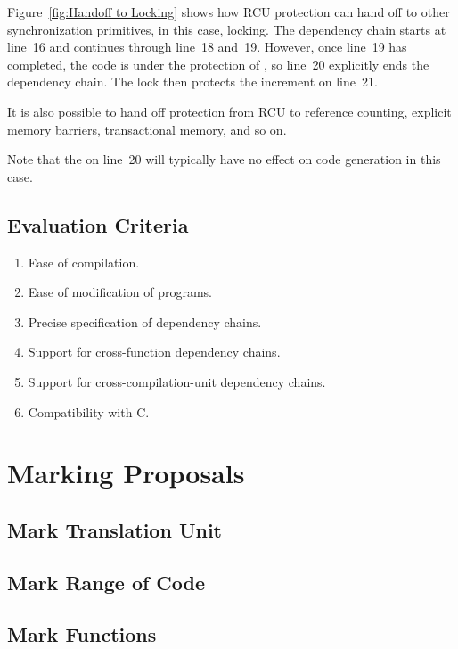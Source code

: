 \documentclass[letterpaper,twocolumn,10pt]{article}
\begin{document}
Figure~\ref{fig:Handoff to Locking}
shows how RCU protection can hand off to other synchronization
primitives, in this case, locking.
The dependency chain starts at line~16 and continues through line~18
and~19.
However, once line~19 has completed, the code is under the protection
of , so line~20 explicitly ends the dependency chain.
The lock then protects the increment on line~21.

It is also possible to hand off protection from RCU to reference counting,
explicit memory barriers, transactional memory, and so on.

Note that the  on line~20 will typically have
no effect on code generation in this case.

\subsection{Evaluation Criteria}
\label{sec:Evaluation Criteria}

\begin{enumerate}
\item	Ease of compilation.
\item	Ease of modification of programs.
\item	Precise specification of dependency chains.
\item	Support for cross-function dependency chains.
\item	Support for cross-compilation-unit dependency chains.
\item	Compatibility with C.
\end{enumerate}

\section{Marking Proposals}
\label{sec:Marking Proposals}

\subsection{Mark Translation Unit}
\label{sec:Mark Translation Unit}

\subsection{Mark Range of Code}
\label{sec:Mark Range of Code}

\subsection{Mark Functions}
\label{sec:Mark Functions}
\end{document}
